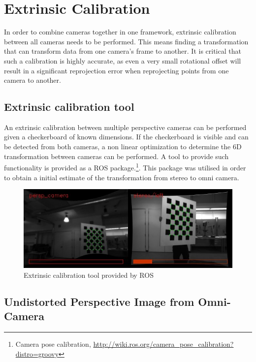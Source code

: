 \chapter{Extrinsic Calibration}
\label{chapter:extrinsic_calibration}

In order to combine cameras together in one framework, extrinsic calibration between all cameras needs to be performed.  This means finding a transformation that can transform data from one camera's frame to another.  It is critical that such a calibration is highly accurate, as even a very small rotational offset will result in a significant reprojection error when reprojecting points from one camera to another.

\section{Extrinsic calibration tool}
\label{sec:ros_tool}

An extrinsic calibration between multiple perspective cameras can be performed given a checkerboard of known dimensions.  If the checkerboard is visible and can be detected from both cameras, a non linear optimization to determine the 6D transformation between cameras can be performed.  A tool to provide such functionality is provided as a ROS package.\footnote{Camera pose calibration, \url{http://wiki.ros.org/camera_pose_calibration?distro=groovy}}.  This package was utilised in order to obtain a initial estimate of the transformation from stereo to omni camera.

\begin{figure}[h!]
  \centering
    \includegraphics[width=1.0\textwidth]{chapters/images/extrinsic_cal_1}
  \caption{Extrinsic calibration tool provided by ROS}
  \label{fig:extrinsic_cal_1}
\end{figure}

\section{Undistorted Perspective Image from Omni-Camera}

